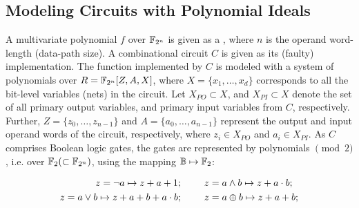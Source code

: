 \subsection{Modeling Circuits with Polynomial Ideals}\label{sec:pmodel} 



A multivariate polynomial $f$ over ${\mathbb{F}}_{2^n}$ is given as a \spec,
where $n$ is the operand word-length (data-path size). A %
combinational circuit $C$ is given as its (faulty) implementation. 
The function implemented by $C$ is modeled with a system of
polynomials over $R={\mathbb{F}}_{2^n}[Z,A,X]$, where $X = \{x_1, \dots,
x_d\}$ corresponds to all the bit-level variables (nets) in the
circuit. Let $X_{PO} \subset X$, and $X_{PI} \subset X$ denote the set of all primary 
output variables, and primary input variables from $C$, respectively. 
Further, $Z=\{z_0,\dots,z_{n-1}\}$ and $A = \{a_0,\dots,a_{n-1}\}$
represent the output and input operand words of the circuit, respectively,
where $z_i\in X_{PO}$ and $a_i\in X_{PI}$. 
As $C$ comprises Boolean logic gates, the gates are represented by
polynomials $\pmod{2}$, i.e. over ${\mathbb{F}}_2 (\subset {\mathbb{F}}_{2^n})$, using the
mapping ${\mathbb{B}}\mapsto {\mathbb{F}}_2$:

\begin{small} 
\begin{align}
\label{bool2poly}
\begin{split}
z =  \neg a \mapsto z+a+1;& ~~~\hspace{0.2in} z =  a \wedge b \mapsto z+a \cdot b;\\
z =  a \vee b \mapsto z+a+b+a \cdot b;& ~~~\hspace{0.2in} z =  a \oplus b \mapsto z+a+b;
\end{split}
\end{align}
\end{small}

